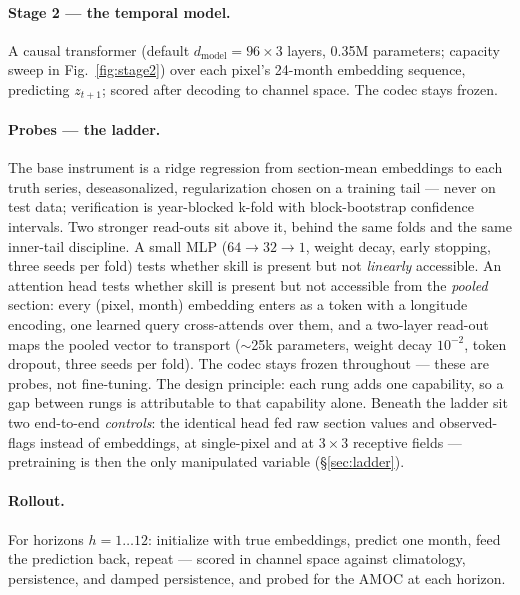 \documentclass[10pt]{article}
\begin{document}
\paragraph{Stage 2 --- the temporal model.} A causal transformer
(default $d_{\mathrm{model}}{=}96\times3$ layers, 0.35M parameters;
capacity sweep in Fig.~\ref{fig:stage2}) over each pixel's 24-month
embedding sequence, predicting $z_{t+1}$; scored after decoding to
channel space. The codec stays frozen.

\paragraph{Probes --- the ladder.} The base instrument is a ridge
regression from section-mean embeddings to each truth series,
deseasonalized, regularization chosen on a training tail --- never on
test data; verification is year-blocked k-fold with block-bootstrap
confidence intervals. Two stronger read-outs sit above it, behind the
same folds and the same inner-tail discipline. A small MLP
($64\to32\to1$, weight decay, early stopping, three seeds per fold)
tests whether skill is present but not \emph{linearly} accessible. An
attention head tests whether skill is present but not accessible from
the \emph{pooled} section: every (pixel, month) embedding enters as a
token with a longitude encoding, one learned query cross-attends over
them, and a two-layer read-out maps the pooled vector to transport
($\sim$25k parameters, weight decay $10^{-2}$, token dropout, three
seeds per fold). The codec stays frozen throughout --- these are probes,
not fine-tuning. The design principle: each rung adds one capability, so
a gap between rungs is attributable to that capability alone. Beneath
the ladder sit two end-to-end \emph{controls}: the identical head fed
raw section values and observed-flags instead of embeddings, at
single-pixel and at $3\times3$ receptive fields --- pretraining is then
the only manipulated variable (\S\ref{sec:ladder}).

\paragraph{Rollout.} For horizons $h=1\ldots12$: initialize with true
embeddings, predict one month, feed the prediction back, repeat ---
scored in channel space against climatology, persistence, and damped
persistence, and probed for the AMOC at each horizon.
\end{document}
